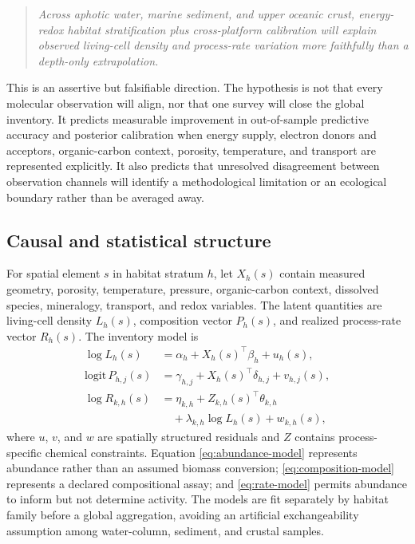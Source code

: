 \documentclass[conference]{../../../../Conference-LaTeX-template_10-17-19/IEEEtran}
\begin{document}
\begin{quote}
\textit{Across aphotic water, marine sediment, and upper oceanic crust, energy-redox habitat stratification plus cross-platform calibration will explain observed living-cell density and process-rate variation more faithfully than a depth-only extrapolation.}
\end{quote}

This is an assertive but falsifiable direction. The hypothesis is not that every molecular observation will align, nor that one survey will close the global inventory. It predicts measurable improvement in out-of-sample predictive accuracy and posterior calibration when energy supply, electron donors and acceptors, organic-carbon context, porosity, temperature, and transport are represented explicitly. It also predicts that unresolved disagreement between observation channels will identify a methodological limitation or an ecological boundary rather than be averaged away.

\subsection{Causal and statistical structure}
For spatial element $s$ in habitat stratum $h$, let $X_h(s)$ contain measured geometry, porosity, temperature, pressure, organic-carbon context, dissolved species, mineralogy, transport, and redox variables. The latent quantities are living-cell density $L_h(s)$, composition vector $P_h(s)$, and realized process-rate vector $R_h(s)$. The inventory model is
\begin{align}
\log L_h(s) &= \alpha_h + X_h(s)^\top\beta_h + u_h(s), \label{eq:abundance-model}\\
\text{logit}\,P_{h,j}(s) &= \gamma_{h,j} + X_h(s)^\top\delta_{h,j} + v_{h,j}(s), \label{eq:composition-model}\\
\log R_{k,h}(s) &= \eta_{k,h} + Z_{k,h}(s)^\top\theta_{k,h} \nonumber\\
&\quad + \lambda_{k,h}\log L_h(s) + w_{k,h}(s), \label{eq:rate-model}
\end{align}
where $u$, $v$, and $w$ are spatially structured residuals and $Z$ contains process-specific chemical constraints. Equation \eqref{eq:abundance-model} represents abundance rather than an assumed biomass conversion; \eqref{eq:composition-model} represents a declared compositional assay; and \eqref{eq:rate-model} permits abundance to inform but not determine activity. The models are fit separately by habitat family before a global aggregation, avoiding an artificial exchangeability assumption among water-column, sediment, and crustal samples.
\end{document}
